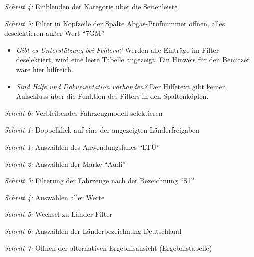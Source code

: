 \textit{Schritt 4:} Einblenden der Kategorie \editHere{} über die Seitenleiste\par
\textit{Schritt 5:} Filter in Kopfzeile der Spalte Abgas-Prüfnummer öffnen, alles deselektieren außer Wert \enquote{7GM}\par
\begin{itemize}
 \item \textit{Gibt es Unterstützung bei Fehlern?} Werden alle Einträge im Filter deselektiert, wird eine leere Tabelle angezeigt. Ein Hinweis für den Benutzer wäre hier hilfreich.\par
 \item \textit{Sind Hilfe und Dokumentation vorhanden?} Der Hilfetext gibt keinen Aufschluss über die Funktion des Filters in den Spaltenköpfen.\par
\end{itemize}
\textit{Schritt 6:} Verbleibendes Fahrzeugmodell selektieren \par
{}\par
\textit{Schritt 1:} Doppelklick auf eine der angezeigten Länderfreigaben\par
{}\par
\textit{Schritt 1:} Auswählen des Anwendungsfalles \enquote{LTÜ}\par
\textit{Schritt 2:} Auswählen der Marke \enquote{Audi}\par
\textit{Schritt 3:} Filterung der Fahrzeuge nach der Bezeichnung \enquote{S1}\par
\textit{Schritt 4:} Auswählen aller Werte\par
\textit{Schritt 5:} Wechsel zu Länder-Filter\par
\textit{Schritt 6:} Auswählen der Länderbezeichnung Deutschland\par
\textit{Schritt 7:} Öffnen der alternativen Ergebnisansicht (Ergebnistabelle)\par
